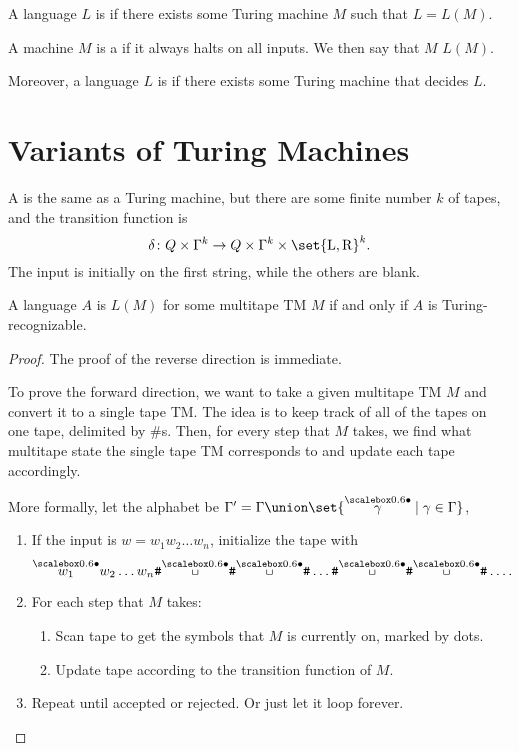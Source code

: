 \documentclass{standalone}
\begin{document}
\begin{definition}
	A language \(L\) is  if there exists some Turing machine \(M\) such that \(L = L(M)\).

	\tcblower
	A machine \(M\) is a  if it always halts on all inputs. We then say that \(M\)  \(L(M)\).

	Moreover, a language \(L\) is  if there exists some Turing machine that decides \(L\).
\end{definition}

\section{Variants of Turing Machines}
\begin{definition}
	A  is the same as a Turing machine, but there are some finite number \(k\) of tapes, and the transition function is
	\[
		\delta \colon Q \times \Gamma^k \to Q \times \Gamma^k \times \set{\mathrm L, \mathrm R}^k.
	\]
	The input is initially on the first string, while the others are blank.
\end{definition}

\begin{proposition}
	A language \(A\) is \(L(M)\) for some multitape \textsf{TM} \(M\) if and only if \(A\) is Turing-recognizable.
\end{proposition}
\begin{proof}
	The proof of the reverse direction is immediate.
	
	To prove the forward direction, we want to take a given multitape \textsf{TM} \(M\) and convert it to a single tape \textsf{TM}. The idea is to keep track of all of the tapes on one tape, delimited by \(\texttt \#\)s. Then, for every step that \(M\) takes, we find what multitape state the single tape \textsf{TM} corresponds to and update each tape accordingly.

	More formally, let the alphabet be \(\Gamma' = \Gamma \union \set{\marksymb{\gamma} \mid \gamma \in \Gamma}\),
	\begin{enumerate}[nosep]
		\item If the input is \(w = w_1 w_2 \ldots w_n\), initialize the tape with
		\[
			\marksymb{w_1} w_2 \ldots w_n \texttt{\#}\marksymb{\blank}\texttt{\#}\marksymb{\blank}\texttt{\#} \ldots \texttt{\#}\marksymb{\blank}\texttt{\#}\marksymb{\blank}\texttt{\#} \ldots.
		\]


		\item For each step that \(M\) takes:
		\begin{enumerate}[nosep]
			\item Scan tape to get the symbols that \(M\) is currently on, marked by dots.
			\item Update tape according to the transition function of \(M\).
		\end{enumerate}

		\item Repeat until accepted or rejected. Or just let it loop forever. \qedhere
	\end{enumerate}
\end{proof}
\end{document}
